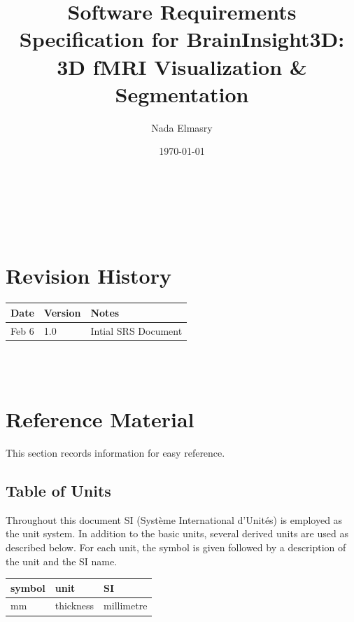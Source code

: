 \documentclass[12pt]{article}
\begin{document}
\title{Software Requirements Specification for BrainInsight3D: 3D fMRI
  Visualization \& Segmentation}
\author{Nada Elmasry}
\date{\today}

\maketitle

~\newpage


\tableofcontents

~\newpage

\section*{Revision History}

\begin{tabularx}{\textwidth}{p{3cm}p{2cm}X}
  \toprule {\bf Date} & {\bf Version} & {\bf Notes}         \\
  \midrule
  Feb 6               & 1.0           & Intial SRS Document \\
  \bottomrule
\end{tabularx}

~\\


~\newpage

\section{Reference Material}

This section records information for easy reference.

\subsection{Table of Units}

Throughout this document SI (Syst\`{e}me International d'Unit\'{e}s) is employed
as the unit system.  In addition to the basic units, several derived units are
used as described below.  For each unit, the symbol is given followed by a
description of the unit and the SI name.
~\newline

\renewcommand{\arraystretch}{1.2}
\noindent \begin{tabular}{l l l}
  \toprule
  \textbf{symbol}   & \textbf{unit} & \textbf{SI} \\
  \midrule
  \si{\milli\metre} & thickness     & millimetre  \\

  \bottomrule
\end{tabular}
\end{document}
